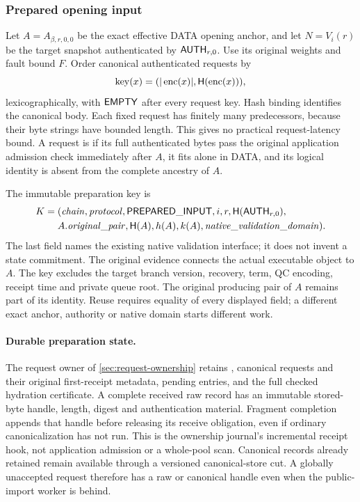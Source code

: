 \subsubsection{Prepared opening input}
\label{sec:input-selection}
\label{sec:prepared-input}
Let $A=A_{\beta,r,0,0}$ be the exact effective DATA opening anchor,
and let $N=V_i(r)$ be the target snapshot authenticated by
$\mathsf{AUTH}_{r,0}$. Use its original weights and fault bound $F$.
Order canonical authenticated requests by
\[
 \operatorname{key}(x)=
 (|\operatorname{enc}(x)|,\mathsf H(\operatorname{enc}(x))),
\]
lexicographically, with $\mathsf{EMPTY}$ after every request key.
Hash binding identifies the canonical body. Each fixed request has
finitely many predecessors, because their byte strings have bounded
length. This gives no practical request-latency bound.
A request is  if its full authenticated bytes
pass the original application admission check immediately after $A$,
it fits alone in DATA, and its logical identity is absent from the
complete ancestry of $A$.

The immutable preparation key is
\[
\begin{split}
 K={}&(\mathit{chain},\mathit{protocol},\mathsf{PREPARED\_INPUT},i,r,
       \mathsf H(\mathsf{AUTH}_{r,0}),\\
     &A.\mathit{original\_pair},\mathsf H(A),h(A),k(A),
       \mathit{native\_validation\_domain}).
\end{split}
\]
The last field names the existing native validation interface; it does
not invent a state commitment. The original evidence connects the actual
executable object to $A$. The key excludes the target branch version,
recovery, term, QC encoding, receipt time and private queue root. The
original producing pair of $A$ remains part of its identity. Reuse
requires equality of every displayed field; a different exact anchor,
authority or native domain starts different work.

\paragraph{Durable preparation state.}
The request owner of \cref{sec:request-ownership} retains
, canonical requests and their original first-receipt
metadata, pending entries, and the full checked hydration certificate.
A complete received raw record has an immutable stored-byte handle,
length, digest and authentication material. Fragment completion appends
that handle before releasing its receive obligation, even if ordinary
canonicalization has not run. This is the ownership journal's incremental
receipt hook, not application admission or a whole-pool scan.
Canonical records already retained remain available through a versioned
canonical-store cut. A globally unaccepted request therefore has a raw
or canonical handle even when the public-import worker is behind.

